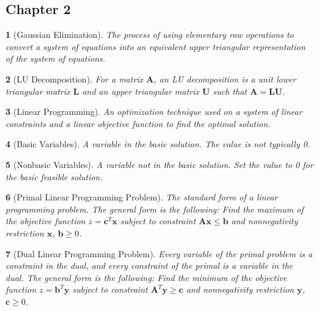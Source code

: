 \documentclass{article}
\theoremstyle{bolddef}
\newtheorem*{definition}{}
\begin{document}
\subsection*{Chapter 2}

\begin{definition}[Gaussian Elimination]
    The process of using elementary row operations to convert a system of equations into an
    equivalent upper triangular representation of the system of equations.
\end{definition}

\begin{definition}[LU Decomposition]
    For a matrix $\mathbf{A}$, an LU decomposition is a 
    unit lower triangular matrix $\mathbf{L}$ and an upper triangular
    matrix $\mathbf{U}$ such that $\mathbf{A} = \mathbf{L}\mathbf{U}$.
\end{definition}

\begin{definition}[Linear Programming]
    An optimization technique used on a system of linear constraints and a linear
    objective function to find the optimal solution.
\end{definition}

\begin{definition}[Basic Variables]
    A variable in the basic solution. The value is not typically 0.
\end{definition}

\begin{definition}[Nonbasic Variables]
    A variable not in the basic solution. Set the value to 0 for the basic feasible solution.
\end{definition}

\begin{definition}[Primal Linear Programming Problem]
    The standard form of a linear programming problem. The general form is the following:
    Find the maximum of the objective function $z = \mathbf{c}^{T}\mathbf{x}$ subject to
    constraint $\mathbf{A}\mathbf{x} \leq \mathbf{b}$ and nonnegativity restriction $\mathbf{x}$, $\mathbf{b} \geq 0$.
\end{definition}

\begin{definition}[Dual Linear Programming Problem]
    Every variable of the primal problem is a constraint in the dual, and every constraint of the primal is 
    a variable in the dual. The general form is the following:
    Find the minimum of the objective function $z = \mathbf{b}^{T}\mathbf{y}$ subject to
    constraint $\mathbf{A}^{T}\mathbf{y} \geq \mathbf{c}$ and nonnegativity restriction $\mathbf{y}$, $\mathbf{c} \geq 0$.
\end{definition}
\end{document}
